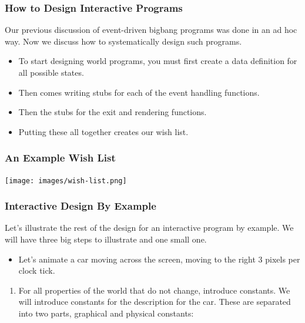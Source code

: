 \documentclass{beamer}
\begin{document}
\begin{frame}
  \frametitle{How to Design Interactive Programs}
  Our previous discussion of event-driven bigbang programs was done in an ad hoc way. Now we discuss how to systematically design such programs.
  \begin{itemize}
  \item<2-> To start designing world programs, you must first create a data definition for all possible states.
  \item<3-> Then comes writing stubs for each of the event handling functions.
  \item<4-> Then the stubs for the exit and rendering functions.
  \item<5-> Putting these all together creates our wish list.
  \end{itemize}
\end{frame}

\begin{frame}
  \frametitle{An Example Wish List}
  \begin{center}
    \texttt{[image: images/wish-list.png]}
  \end{center}
\end{frame}



\begin{frame}
  \frametitle{Interactive Design By Example}
  Let's illustrate the rest of the design for an interactive program by example.
  We will have three big steps to illustrate and one small one.
  \begin{itemize}
  \item<2-> Let's animate a car moving across the screen, moving to the right 3 pixels per clock tick. 
  \end{itemize}
  \begin{enumerate}
  \item<3-> For all properties of the world that do not change, introduce constants.
    We will introduce constants for the description for the car. These are separated into two parts, graphical and physical constants:
    \constants
  \end{enumerate}
\end{frame}
\end{document}
